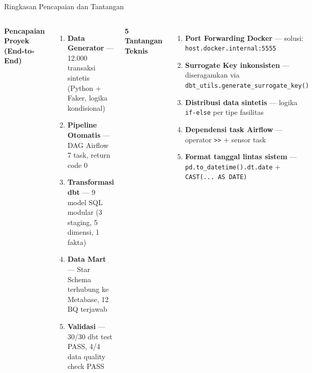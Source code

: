 \documentclass[xcolor=table,t,aspectratio=169]{beamer}
\begin{document}
\begin{frame}{Ringkasan Pencapaian dan Tantangan}
  \footnotesize
  \begin{columns}[T]
    \textbf{Pencapaian Proyek (End-to-End)}
    \begin{enumerate}
      \scriptsize
      \item \textbf{Data Generator} --- 12.000 transaksi sintetis (Python + Faker, logika kondisional)
      \item \textbf{Pipeline Otomatis} --- DAG Airflow 7 task, return code 0
      \item \textbf{Transformasi dbt} --- 9 model SQL modular (3 staging, 5 dimensi, 1 fakta)
      \item \textbf{Data Mart} --- Star Schema terhubung ke Metabase, 12 BQ terjawab
      \item \textbf{Validasi} --- 30/30 dbt test PASS, 4/4 data quality check PASS
    \end{enumerate}

    \textbf{5 Tantangan Teknis}
    \begin{enumerate}
      \scriptsize
      \item \textbf{Port Forwarding Docker} --- solusi: \texttt{host.docker.internal:5555}
      \item \textbf{Surrogate Key inkonsisten} --- diseragamkan via \texttt{dbt\_utils.generate\_surrogate\_key()}
      \item \textbf{Distribusi data sintetis} --- logika \texttt{if-else} per tipe fasilitas
      \item \textbf{Dependensi task Airflow} --- operator \texttt{>>} + sensor task
      \item \textbf{Format tanggal lintas sistem} --- \texttt{pd.to\_datetime().dt.date} + \texttt{CAST(... AS DATE)}
    \end{enumerate}
  \end{columns}
\end{frame}
\end{document}
